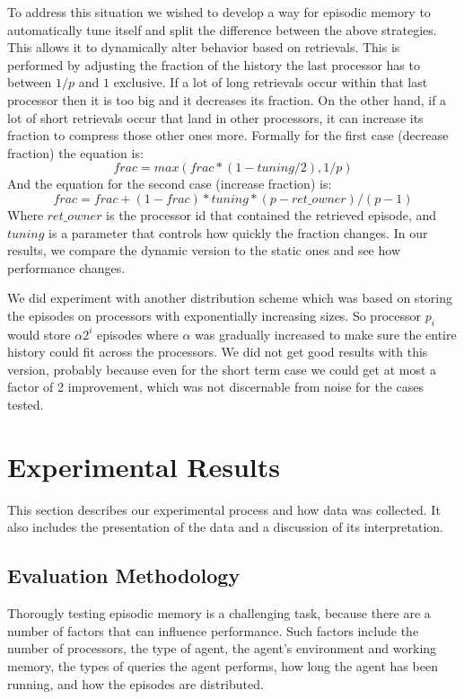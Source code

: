 \documentclass[11pt]{article} %
\begin{document}
To address this situation we wished to develop a way for episodic memory
to automatically tune itself and split the difference
between the above strategies. This allows it to dynamically alter behavior based on
retrievals. This is performed by adjusting the fraction of the history the last processor
has to between $1/p$ and $1$ exclusive. If a lot of long retrievals occur within that
last processor then it is too big and it decreases its fraction. On the other hand, 
if a lot of short retrievals occur that land in other processors, it can increase its fraction to
compress those other ones more. Formally for the first case (decrease fraction) the equation is:
\begin{equation}
frac = max(frac * (1 - tuning/2), 1/p)
\end{equation}
And the equation for the second case (increase fraction) is:
\begin{equation}
frac = frac + (1 - frac) * tuning * (p - ret\_owner)/(p-1)
\end{equation}
Where $ret\_owner$ is the processor id that contained the retrieved episode, and $tuning$
is a parameter that controls how quickly the fraction changes. In our results, we compare
the dynamic version to the static ones and see how performance changes. 

We did experiment with another distribution scheme which was based on storing the
episodes on processors with exponentially increasing sizes. So processor $p_i$ would store $\alpha2^i$ episodes 
where $\alpha$ was gradually increased to make sure the entire history could fit across the processors. 
We did not get good results with this version, probably because even for the short term case we could 
get at most a factor of 2 improvement, which was not discernable from noise for the cases tested. 

\section{Experimental Results}
This section describes our experimental process and how data was collected. 
It also includes the presentation of the data and a discussion of its interpretation. 

\subsection{Evaluation Methodology}
Thorougly testing episodic memory is a challenging task, because there are a number
of factors that can influence performance. Such factors include the number of processors,
the type of agent, the agent's environment and working memory,  the types of queries the agent performs,
 how long the agent has been running, and how the episodes are distributed. 
\end{document}
